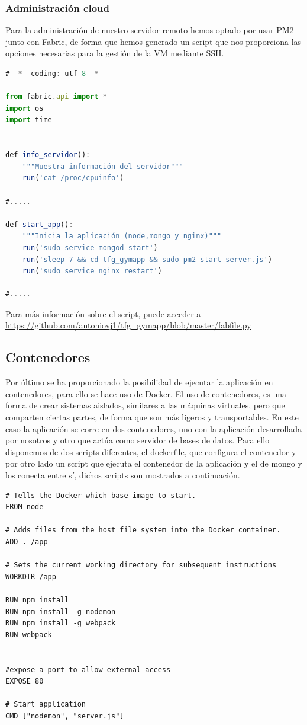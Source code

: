 \subsubsection {Administración cloud}
Para la administración de nuestro servidor remoto hemos optado por usar PM2 junto con Fabric, de forma que hemos generado un script que nos proporciona las opciones necesarias para la gestión de la VM mediante SSH.

\begin{lstlisting}[language=javascript,caption={Administración cloud},label={lst:appjs}]
# -*- coding: utf-8 -*-

from fabric.api import *
import os
import time


def info_servidor():
    """Muestra información del servidor"""
    run('cat /proc/cpuinfo')

#.....

def start_app():
    """Inicia la aplicación (node,mongo y nginx)"""
    run('sudo service mongod start')
    run('sleep 7 && cd tfg_gymapp && sudo pm2 start server.js')
    run('sudo service nginx restart')

#.....    

\end{lstlisting}

Para más información sobre el script, puede acceder a \url{https://github.com/antoniovj1/tfg_gymapp/blob/master/fabfile.py}

\subsection {Contenedores}
Por último se ha proporcionado la posibilidad de ejecutar la aplicación en contenedores, para ello se hace uso de Docker. El uso de contenedores, es una forma de crear sistemas aislados, similares a las máquinas virtuales, pero que comparten ciertas partes, de forma que son más ligeros y transportables. En este caso la aplicación se corre en dos contenedores, uno con la aplicación desarrollada por nosotros y otro que actúa como servidor de bases de datos. Para ello disponemos de dos scripts diferentes, el dockerfile, que configura el contenedor y por otro lado un script que ejecuta el contenedor de la aplicación y el de mongo y los conecta entre sí, dichos scripts son mostrados a continuación.

\begin{lstlisting}
# Tells the Docker which base image to start.
FROM node

# Adds files from the host file system into the Docker container.  
ADD . /app

# Sets the current working directory for subsequent instructions
WORKDIR /app

RUN npm install
RUN npm install -g nodemon
RUN npm install -g webpack
RUN webpack


#expose a port to allow external access
EXPOSE 80

# Start application
CMD ["nodemon", "server.js"] 
\end{lstlisting}

